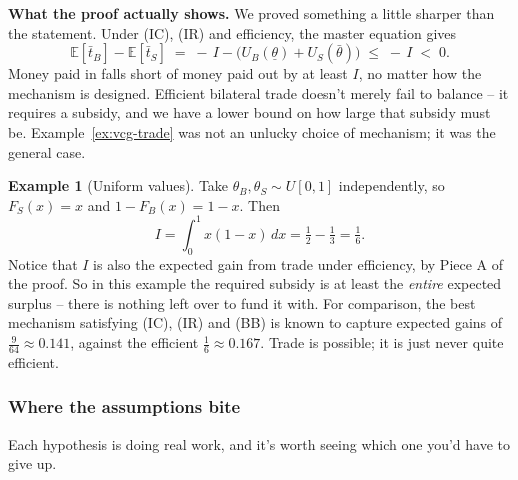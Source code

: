 \documentclass[12pt]{article}
\newcommand{\bbE}{\mathbb{E}}
\theoremstyle{definition}
\newtheorem{example}[theorem]{Example}
\theoremstyle{remark}
\theoremstyle{plain}                          %
\newcommand{\lo}{\underline{\theta}}
\newcommand{\hi}{\bar{\theta}}
\begin{document}
\begin{keybox}
\textbf{What the proof actually shows.} We proved something a little sharper than the statement. Under (IC), (IR) and efficiency, the master equation gives
\[
    \bbE[\bar t_B] - \bbE[\bar t_S] \;=\; -\,I - \big(U_B(\lo)+U_S(\hi)\big) \;\le\; -\,I \;<\; 0.
\]
Money paid in falls short of money paid out by at least $I$, no matter how the mechanism is designed. Efficient bilateral trade doesn't merely fail to balance -- it requires a subsidy, and we have a lower bound on how large that subsidy must be. Example~\ref{ex:vcg-trade} was not an unlucky choice of mechanism; it was the general case.
\end{keybox}
 
\begin{example}[Uniform values]
Take $\theta_B,\theta_S \sim U[0,1]$ independently, so $F_S(x) = x$ and $1-F_B(x) = 1-x$. Then
\[
    I = \int_0^1 x(1-x)\,dx = \tfrac{1}{2} - \tfrac{1}{3} = \tfrac{1}{6}.
\]
Notice that $I$ is also the expected gain from trade under efficiency, by Piece A of the proof. So in this example the required subsidy is at least the \emph{entire} expected surplus -- there is nothing left over to fund it with. For comparison, the best mechanism satisfying (IC), (IR) and (BB) is known to capture expected gains of $\tfrac{9}{64} \approx 0.141$, against the efficient $\tfrac{1}{6} \approx 0.167$. Trade is possible; it is just never quite efficient.
\end{example}
 
\subsubsection{Where the assumptions bite}
 
Each hypothesis is doing real work, and it's worth seeing which one you'd have to give up.
 
\end{document}
